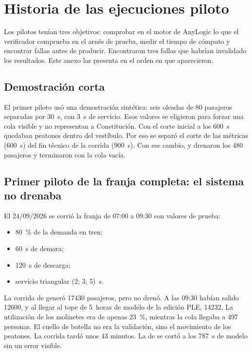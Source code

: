 \section{Historia de las ejecuciones piloto}
\label{anx:pilotos}

Los pilotos tenían tres objetivos: comprobar en el motor de AnyLogic lo que el verificador comprueba en
el arnés de prueba, medir el tiempo de cómputo y encontrar fallas antes de producir. Encontraron tres
fallas que habrían invalidado los resultados. Este anexo las presenta en el orden en que aparecieron.

\subsection{Demostración corta}

El primer piloto usó una demostración sintética: seis oleadas de 80 pasajeros separadas por 30~s, con 3~s
de servicio. Esos valores se eligieron para forzar una cola visible y no representan a Constitución. Con
el corte inicial a los 600~s quedaban peatones dentro del vestíbulo. Por eso se separó el corte de las
métricas (600~s) del fin técnico de la corrida (900~s). Con ese cambio, \EO{} y \EI{} drenaron los 480
pasajeros y terminaron con la cola vacía.

\subsection{Primer piloto de la franja completa: el sistema no drenaba}

El 24/09/2026 se corrió la franja de 07:00 a 09:30 con valores de prueba:
\begin{itemize}
  \item 80~\% de la demanda en tren;
  \item 60~s de demora;
  \item 120~s de descarga;
  \item servicio triangular (2; 3; 5)~s.
\end{itemize}
La corrida de \EO{} generó \num{17430} pasajeros, pero no drenó. A las 09:30 habían salido \num{12600}, y
al llegar al tope de 5~horas de modelo de la edición PLE, \num{14232}. La utilización de los molinetes
era de apenas 23~\%, mientras la cola llegaba a 497 personas. El cuello de botella no era la validación,
sino el movimiento de los peatones. La corrida tardó unos 43 minutos. La de \EI{} se cortó a los 787~s
de modelo sin un error visible.

